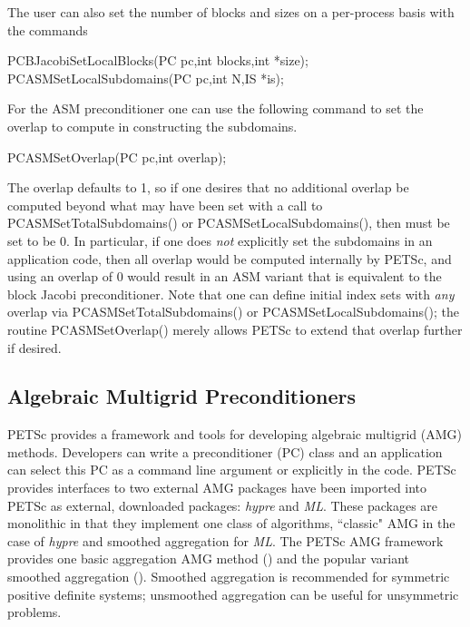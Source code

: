 The user can also set the number of blocks and sizes on a per-process
basis with the commands
\begin{tabbing}
  PCBJacobiSetLocalBlocks(PC pc,int blocks,int *size);\\
  PCASMSetLocalSubdomains(PC pc,int N,IS *is);
\end{tabbing}

For the ASM preconditioner one can use the following command to set
the overlap to compute in constructing the subdomains.
\begin{tabbing}
  PCASMSetOverlap(PC pc,int overlap);
\end{tabbing}
The overlap defaults to 1, so if one desires that no additional
overlap be computed beyond what may have been set with a call to PCASMSetTotalSubdomains() or PCASMSetLocalSubdomains(), then
 must be set to be 0.  In particular, if one does {\em
not} explicitly set the subdomains in an application code, then all
overlap would be computed internally by PETSc, and using an overlap of
0 would result in an ASM variant that is equivalent to the block
Jacobi preconditioner.  Note that one can define initial index sets
 with {\em any} overlap via PCASMSetTotalSubdomains() or
PCASMSetLocalSubdomains(); the routine PCASMSetOverlap()
merely allows PETSc to extend that overlap further if desired.

\subsection{Algebraic Multigrid Preconditioners}

PETSc provides a framework and tools for developing algebraic multigrid (AMG) methods.
Developers can write a preconditioner (PC) class and an application can select this PC as a command line argument or explicitly in the code.
PETSc provides interfaces to two external AMG packages have been imported into PETSc as external, downloaded packages: {\it hypre} and {\it ML}.
These packages are monolithic in that they implement one class of algorithms, ``classic" AMG in the case of  {\it hypre}  and smoothed aggregation for {\it ML}.
The PETSc AMG framework provides one basic aggregation AMG method () and the popular variant smoothed aggregation ().
Smoothed aggregation is recommended for symmetric positive definite systems;  unsmoothed aggregation can be useful for unsymmetric problems.

